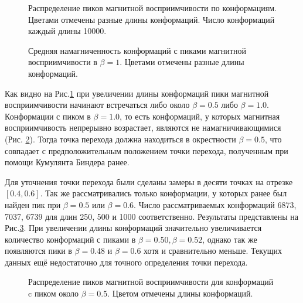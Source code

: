 \begin{figure}[htb]
	\centering
	
	\caption{Распределение пиков магнитной восприимчивости по конформациям. Цветами отмечены разные длины конформаций. Число конформаций каждый длины 10000. }
	\label{fig:ms_peaks}
\end{figure}


\begin{figure}[hbt]
	\centering
	
	\caption{Средняя намагниченность конформаций с пиками магнитной восприимчивости в $\beta = 1$. Цветами отмечены разные длины конформаций.}
	\label{fig:no_peaks_mag2}
\end{figure}


Как видно на Рис.\ref{fig:ms_peaks} при увеличении длины конформаций пики магнитной восприимчивости начинают встречаться либо около $\beta = 0.5$ либо $\beta = 1.0$. Конформации с пиком в $\beta = 1.0$, то есть конформаций, у которых магнитная восприимчивость непрерывно возрастает, являются не намагничивающимися (Рис. \ref{fig:no_peaks_mag2}). Тогда точка перехода должна находиться в окрестности $\beta = 0.5$, что совпадает с предположительным положением точки перехода, полученным при помощи Кумулянта Биндера \cite{binder_cumulant} ранее.


Для уточнения точки перехода были сделаны замеры в десяти точках на отрезке $[0.4, 0.6]$. Так же рассматривались только конформации, у которых ранее был найден пик при $\beta=0.5$ или $\beta=0.6$. Число рассматриваемых конформаций 6873, 7037, 6739 для длин 250, 500 и 1000 соответственно. Результаты представлены на Рис.\ref{fig:ms_peaks_close}. При увеличении длины конформаций значительно увеличивается количество конформаций с пиками в $\beta = 0.50, \beta = 0.52$, однако так же появляются пики в $\beta = 0.48$ и $ \beta = 0.6$ хотя и сравнительно меньше. Текущих данных ещё недостаточно для точного определения точки перехода.


\begin{figure}[htb]
	\centering
	
	\caption{Распределение пиков магнитной восприимчивости для конформаций c пиком около $\beta = 0.5$. Цветом отмечены длины конформаций.}
	\label{fig:ms_peaks_close}
\end{figure}

